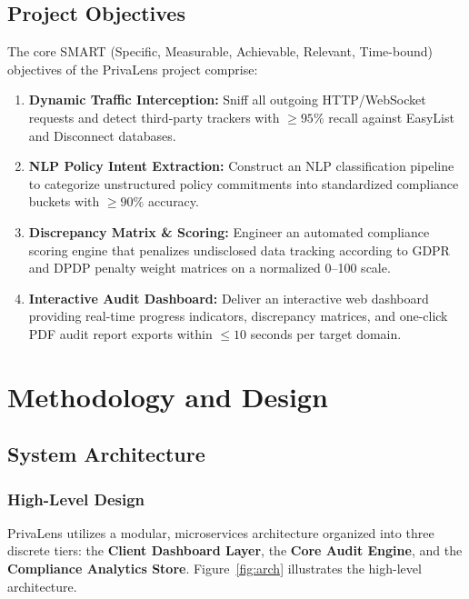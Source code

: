 \documentclass[12pt, a4paper, oneside]{report}
\begin{document}
\section{Project Objectives}
The core SMART (Specific, Measurable, Achievable, Relevant, Time-bound) objectives of the PrivaLens project comprise:
\begin{enumerate}
    \item \textbf{Dynamic Traffic Interception:} Sniff all outgoing HTTP/WebSocket requests and detect third-party trackers with $\ge 95\%$ recall against EasyList and Disconnect databases.
    \item \textbf{NLP Policy Intent Extraction:} Construct an NLP classification pipeline to categorize unstructured policy commitments into standardized compliance buckets with $\ge 90\%$ accuracy.
    \item \textbf{Discrepancy Matrix \& Scoring:} Engineer an automated compliance scoring engine that penalizes undisclosed data tracking according to GDPR and DPDP penalty weight matrices on a normalized 0--100 scale.
    \item \textbf{Interactive Audit Dashboard:} Deliver an interactive web dashboard providing real-time progress indicators, discrepancy matrices, and one-click PDF audit report exports within $\le 10$ seconds per target domain.
\end{enumerate}

\chapter{Methodology and Design}

\section{System Architecture}
\subsection{High-Level Design}
PrivaLens utilizes a modular, microservices architecture organized into three discrete tiers: the \textbf{Client Dashboard Layer}, the \textbf{Core Audit Engine}, and the \textbf{Compliance Analytics Store}. Figure~\ref{fig:arch} illustrates the high-level architecture.
\end{document}
